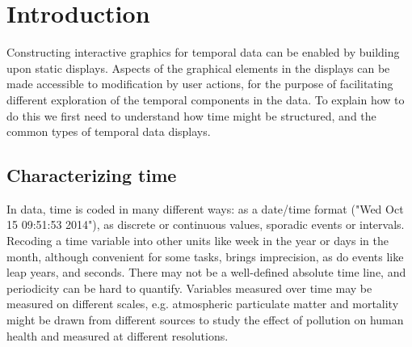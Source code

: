 \documentclass[12pt]{article}
\begin{document}

\section{Introduction}

Constructing interactive graphics for temporal data can be enabled by building upon static displays. Aspects of the graphical elements in the displays can be made accessible to modification by user actions, for the purpose of facilitating different exploration of the temporal components in the data. To explain how to do this we first need to understand how time might be structured, and the common types of temporal data displays. 



\subsection{Characterizing time}

In data, time is coded in many different ways: as a date/time format ("Wed Oct 15 09:51:53 2014"), as discrete or continuous values, sporadic events or intervals. Recoding a time variable into other units like week in the year or days in the month, although convenient for some tasks, brings imprecision, as do events like leap years, and seconds. There may not be a well-defined absolute time line, and periodicity can be hard to quantify. Variables measured over time may be measured on different scales, e.g. atmospheric particulate matter and mortality might be drawn from different sources to study the effect of pollution on human health and measured at different resolutions. 

\end{document}
